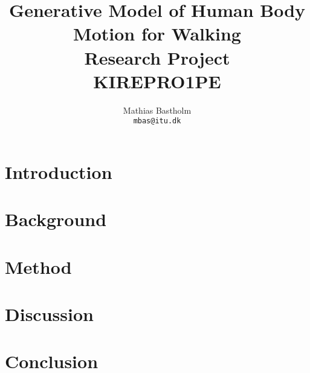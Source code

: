 \documentclass{article}
\title{%
    Generative Model of Human Body Motion for Walking\\
    \large Research Project\\
    \small KIREPRO1PE
}
\author{%
    Mathias Bastholm\\
    \texttt{mbas@itu.dk}
}
\begin{document}
\maketitle

\section{Introduction}\label{sec:introduction}


\section{Background}\label{sec:background}


\section{Method}\label{sec:method}


\section{Discussion}\label{sec:discussion}


\section{Conclusion}\label{sec:conclusion}


\newpage
\printbibliography%
\end{document}
